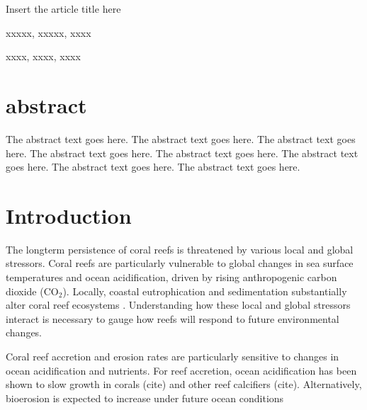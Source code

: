 \documentclass{article}%
\begin{document}
Insert the article title here




xxxxx, xxxxx, xxxx

xxxx, xxxx, xxxx


\linenumbers %
\section{abstract}
The abstract text goes here. The abstract text goes here. The abstract text goes here. The abstract text goes here.
The abstract text goes here. The abstract text goes here. The abstract text goes here. The abstract text goes here.




\section{Introduction  }

The longterm persistence of coral reefs is threatened by various local and global stressors. Coral reefs are particularly vulnerable to global changes in sea surface temperatures and ocean acidification, driven by rising anthropogenic carbon dioxide (CO$_2$)\cite{Hoegh-Guldberg2007,pandolfi2011projecting}. Locally, coastal eutrophication and sedimentation substantially alter coral reef ecosystems \cite{fabricius2005effects,rogers1990responses}. Understanding how these local and global stressors interact is necessary to gauge how reefs will respond to future environmental changes. 

Coral reef accretion and erosion rates are particularly sensitive to changes in ocean acidification and nutrients. For reef accretion, ocean acidification has been shown to slow growth in corals (cite) and other reef calcifiers (cite). Alternatively, bioerosion is expected to increase under future ocean conditions \cite{silbiger2014reefs,silbiger2014secondary,Wisshak2012,Tribollet2009} 
\end{document}
